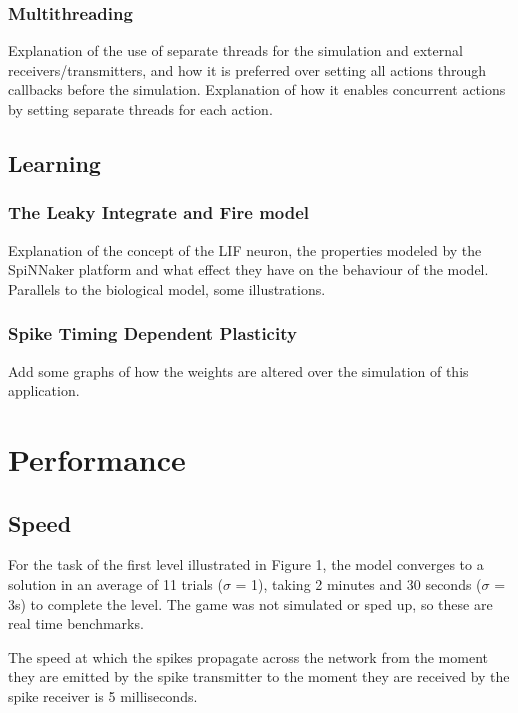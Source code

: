 \documentclass[10pt]{article}
\begin{document}
    \subsubsection{Multithreading}

    Explanation of the use of separate threads for the simulation and external receivers/transmitters, and how it is preferred over setting all actions through callbacks before the simulation. Explanation of how it enables concurrent actions by setting separate threads for each action.

    \subsection{Learning}

    \subsubsection{The Leaky Integrate and Fire model}

    Explanation of the concept of the LIF neuron, the properties modeled by the SpiNNaker platform and what effect they have on the behaviour of the model. Parallels to the biological model, some illustrations.

    \subsubsection{Spike Timing Dependent Plasticity}

    Add some graphs of how the weights are altered over the simulation of this application.

    \section{Performance}

    \subsection{Speed}

    For the task of the first level illustrated in Figure 1, the model converges to a solution in an average of 11 trials ($\sigma$ = 1), taking 2 minutes and 30 seconds ($\sigma$ = 3s) to complete the level. The game was not simulated or sped up, so these are real time benchmarks.

    The speed at which the spikes propagate across the network from the moment they are emitted by the spike transmitter to the moment they are received by the spike receiver is 5 milliseconds.
\end{document}
